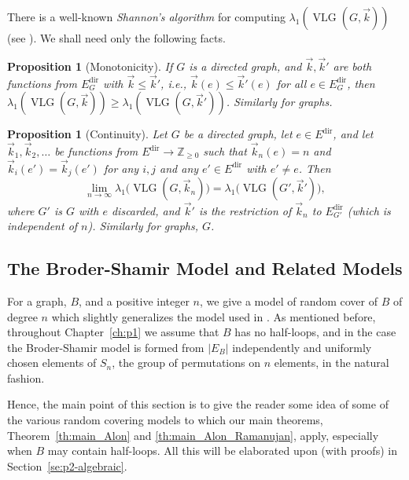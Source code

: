 \documentclass{memo-l}
\theoremstyle{plain}
\newtheorem{proposition}[theorem]{Proposition}
\theoremstyle{definition}
\numberwithin{section}{chapter}
\numberwithin{equation}{chapter}
\newcommand{\integers}{{\mathbb Z}}
\DeclareMathOperator{\VLG}{VLG}
\newcommand{\Edir}{E^{\mathrm{dir}}}
\theoremstyle{plain}
\theoremstyle{definition}
\begin{document}
There is a well-known {\em Shannon's algorithm} for computing 
$\lambda_1(\VLG(G,\vec k))$ (see \cite{friedman_alon}).  
We shall need only the following facts.

\begin{proposition}[Monotonicity]
\label{pr:vlg_greater_than}
If $G$ is a directed graph, and
$\vec k,\vec k'$ are both functions from $\Edir_G$ with
$\vec k\le \vec k'$, i.e., $\vec k(e)\le \vec k'(e)$ for all $e\in \Edir_G$,
then $\lambda_1(\VLG(G,\vec k))\ge \lambda_1(\VLG(G,\vec k'))$.
Similarly for graphs.
\end{proposition}

\begin{proposition}[Continuity]
\label{pr:vlg_limit}
Let $G$ be a directed graph, let $e\in \Edir$, and let 
$\vec k_1,\vec k_2,\ldots$ be functions from $\Edir\to\integers_{\ge 0}$
such that $\vec k_n(e)=n$ and $\vec k_i(e')=\vec k_j(e')$ for any
$i,j$ and any $e'\in \Edir$ with $e'\ne e$.  Then
$$
\lim_{n\to\infty} \lambda_1\bigl( \VLG(G,\vec k_n) \bigr) 
=
\lambda_1 \bigl( \VLG(G',\vec k') \bigr) ,
$$
where $G'$ is $G$ with $e$ discarded, and $\vec k'$ is the restriction of
$\vec k_n$ to $\Edir_{G'}$ (which is independent of $n$).
Similarly for graphs, $G$.
\end{proposition}

\subsection{The Broder-Shamir Model and Related Models}
\label{sb:intro_to_broder_shamir}

For a graph, \( B
\), and a positive integer \( n \), 
we give a model of random cover of \( B \) of
degree \( n \) which slightly generalizes the model used in
\cite{friedman_relative}.
As mentioned before, throughout Chapter~\ref{ch:p1} we assume
that $B$ has no half-loops, and in the case the Broder-Shamir
model is formed from $|E_B|$ independently and uniformly chosen
elements of $S_n$, the group of permutations on $n$ elements, in
the natural fashion.

Hence, the main point of this section is to give the reader some
idea of some of the various random covering models to which our
main theorems, Theorem~\ref{th:main_Alon} and \ref{th:main_Alon_Ramanujan},
apply, especially when $B$ may contain half-loops.
All
this will be elaborated upon (with proofs) in Section~\ref{se:p2-algebraic}.
\end{document}

